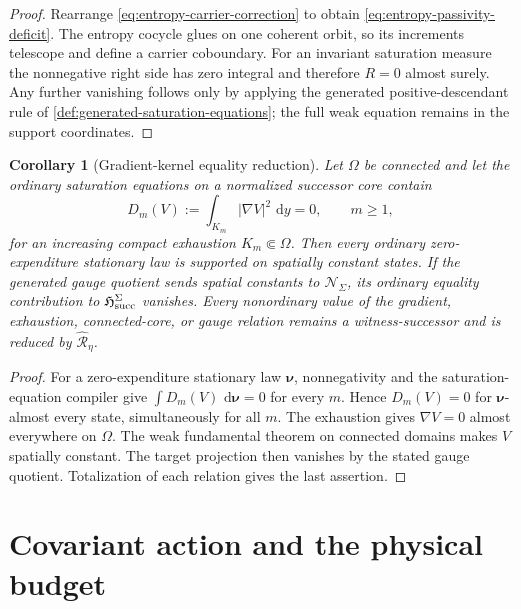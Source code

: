 \documentclass[11pt]{article}
\numberwithin{section}{part}
\theoremstyle{plain}
\newtheorem{corollary}[corollary]{Corollary}
\theoremstyle{definition}
\theoremstyle{remark}
\newcommand{\dd}{\,\mathrm d}
\newcommand{\Null}{\mathscr N}
\begin{document}
\begin{proof}
Rearrange \eqref{eq:entropy-carrier-correction} to obtain
\eqref{eq:entropy-passivity-deficit}.  The entropy cocycle glues on one
coherent orbit, so its increments telescope and define a carrier coboundary.
For an invariant saturation measure the nonnegative right side has zero
integral and therefore \(R=0\) almost surely.  Any further vanishing follows
only by applying the generated positive-descendant rule of
\cref{def:generated-saturation-equations}; the full weak equation remains in
the support coordinates.
\end{proof}

\begin{corollary}[Gradient-kernel equality reduction]
\label{cor:gradient-kernel-equality-reduction}
Let \(\Omega\) be connected and let the ordinary saturation equations on a
normalized successor core contain
\begin{equation}
 \label{eq:local-gradient-kernel-production}
 D_m(V):=\int_{K_m}|\nabla V|^2\,\dd y=0,
 \qquad m\ge1,
\end{equation}
for an increasing compact exhaustion \(K_m\Subset\Omega\).  Then every
ordinary zero-expenditure stationary law is supported on spatially constant
states.  If the generated gauge quotient sends spatial constants to
\(\Null_\Sigma\), its ordinary equality contribution to
\(\mathfrak H_{\rm succ}^{\Sigma}\) vanishes.  Every nonordinary value of the
gradient, exhaustion, connected-core, or gauge relation remains a
witness-successor and is reduced by \(\widehat{\mathcal R}_\eta\).
\end{corollary}

\begin{proof}
For a zero-expenditure stationary law \(\boldsymbol\nu\), nonnegativity and
the saturation-equation compiler give
\(\int D_m(V)\,\dd\boldsymbol\nu=0\) for every \(m\).  Hence
\(D_m(V)=0\) for \(\boldsymbol\nu\)-almost every state, simultaneously for
all \(m\).  The exhaustion gives \(\nabla V=0\) almost everywhere on
\(\Omega\).  The weak fundamental theorem on connected domains makes \(V\)
spatially constant.  The target projection then vanishes by the stated gauge
quotient.  Totalization of each relation gives the last assertion.
\end{proof}

\section{Covariant action and the physical budget}
\label{sec:covariant-action}
\end{document}
